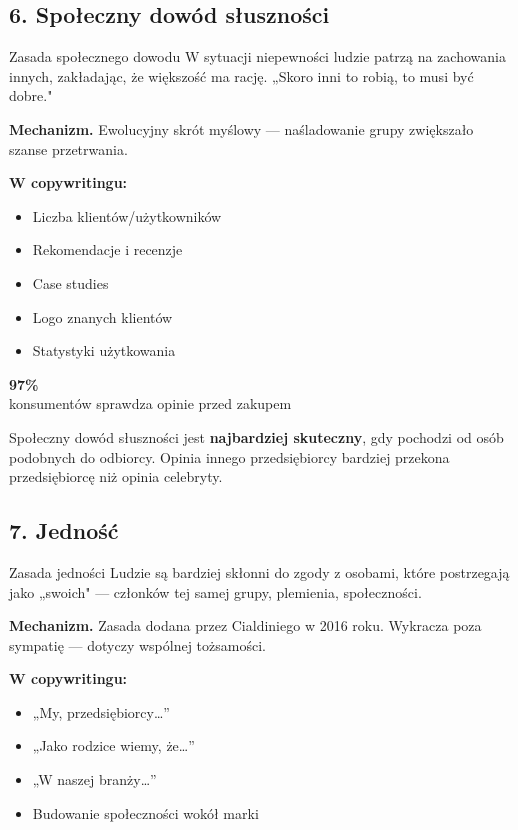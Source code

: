 \documentclass[
  12pt,
  a4paper,
  twoside,
  openright,
  12pt,
  DIV=12,
  BCOR=12mm]{scrbook}
\providecommand{\tightlist}{%
  \setlength{\itemsep}{0pt}\setlength{\parskip}{0pt}}\usepackage{longtable,booktabs,array}
\newcommand{\stathighlight}[2]{%
  \begin{center}
    \begin{tcolorbox}[
      enhanced,
      colback=primarylight,
      colframe=primaryblue,
      boxrule=1pt,
      arc=5pt,
      width=0.6\textwidth,
      halign=center
    ]
      {\fontsize{36}{40}\selectfont\bfseries\color{primarydark}#1}\\[5pt]
      {\color{textmuted}#2}
    \end{tcolorbox}
  \end{center}
}
\begin{document}
\subsection{6. Społeczny dowód
słuszności}\label{spoux142eczny-dowuxf3d-sux142usznoux15bci}

\begin{pojecie}{Zasada społecznego dowodu}
W sytuacji niepewności ludzie patrzą na zachowania innych, zakładając, że większość ma rację. „Skoro inni to robią, to musi być dobre."
\end{pojecie}

\textbf{Mechanizm.} Ewolucyjny skrót myślowy --- naśladowanie grupy
zwiększało szanse przetrwania.

\textbf{W copywritingu:}

\begin{itemize}
\tightlist
\item
  Liczba klientów/użytkowników
\item
  Rekomendacje i recenzje
\item
  Case studies
\item
  Logo znanych klientów
\item
  Statystyki użytkowania
\end{itemize}

\stathighlight{97\%}{konsumentów sprawdza opinie przed zakupem}

\begin{uwaga}
Społeczny dowód słuszności jest \textbf{najbardziej skuteczny}, gdy pochodzi od osób podobnych do odbiorcy. Opinia innego przedsiębiorcy bardziej przekona przedsiębiorcę niż opinia celebryty.
\end{uwaga}

\subsection{7. Jedność}\label{jednoux15bux107}

\begin{pojecie}{Zasada jedności}
Ludzie są bardziej skłonni do zgody z osobami, które postrzegają jako „swoich" --- członków tej samej grupy, plemienia, społeczności.
\end{pojecie}

\textbf{Mechanizm.} Zasada dodana przez Cialdiniego w 2016 roku.
Wykracza poza sympatię --- dotyczy wspólnej tożsamości.

\textbf{W copywritingu:}

\begin{itemize}
\tightlist
\item
  „My, przedsiębiorcy\ldots''
\item
  „Jako rodzice wiemy, że\ldots''
\item
  „W naszej branży\ldots''
\item
  Budowanie społeczności wokół marki
\end{itemize}
\end{document}
